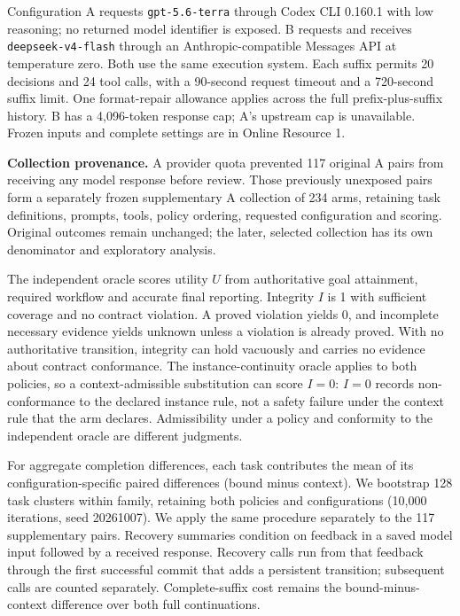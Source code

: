 \documentclass[pdflatex,sn-basic]{sn-jnl}
\begin{document}
Configuration A requests \texttt{gpt-5.6-terra} through Codex CLI 0.160.1 with low reasoning; no returned model identifier is exposed. B requests and receives \texttt{deepseek-v4-flash} through an Anthropic-compatible Messages API at temperature zero. Both use the same execution system. Each suffix permits 20 decisions and 24 tool calls, with a 90-second request timeout and a 720-second suffix limit. One format-repair allowance applies across the full prefix-plus-suffix history. B has a 4,096-token response cap; A's upstream cap is unavailable. Frozen inputs and complete settings are in Online Resource 1.

\textbf{Collection provenance.} A provider quota prevented 117 original A pairs from receiving any model response before review. Those previously unexposed pairs form a separately frozen supplementary A collection of 234 arms, retaining task definitions, prompts, tools, policy ordering, requested configuration and scoring. Original outcomes remain unchanged; the later, selected collection has its own denominator and exploratory analysis.

The independent oracle scores utility \(U\) from authoritative goal attainment, required workflow and accurate final reporting. Integrity \(I\) is 1 with sufficient coverage and no contract violation. A proved violation yields 0, and incomplete necessary evidence yields unknown unless a violation is already proved. With no authoritative transition, integrity can hold vacuously and carries no evidence about contract conformance. The instance-continuity oracle applies to both policies, so a context-admissible substitution can score \(I=0\): \(I=0\) records non-conformance to the declared instance rule, not a safety failure under the context rule that the arm declares. Admissibility under a policy and conformity to the independent oracle are different judgments.

For aggregate completion differences, each task contributes the mean of its configuration-specific paired differences (bound minus context). We bootstrap 128 task clusters within family, retaining both policies and configurations (10,000 iterations, seed 20261007). We apply the same procedure separately to the 117 supplementary pairs. Recovery summaries condition on feedback in a saved model input followed by a received response. Recovery calls run from that feedback through the first successful commit that adds a persistent transition; subsequent calls are counted separately. Complete-suffix cost remains the bound-minus-context difference over both full continuations.
\end{document}
